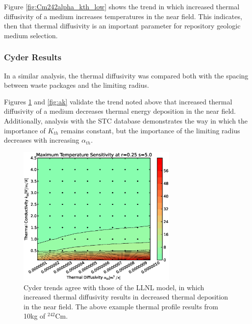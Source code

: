 Figure \ref{fig:Cm242alpha_kth_low} shows the trend in which increased thermal 
diffusivity of a medium increases temperatures in the near field. This 
indicates, then that thermal diffusivity is an important parameter for 
repository geologic medium selection.

%


\FloatBarrier
\subsubsection{Cyder Results}

In a similar analysis, the thermal diffusivity was compared both with the 
spacing between waste packages and the limiting radius. 

Figures \ref{fig:ar} and \ref{fig:ak} validate the trend noted above that 
increased thermal diffusivity of a medium decreases thermal energy deposition 
in the near field.  Additionally, analysis with the \Cyder STC database 
demonstrates the way in which the importance of $K_{th}$ remains constant, but 
the importance of the limiting radius decreases with increasing $\alpha_{th}$.

\begin{figure}[htbp!]
\begin{center}
\includegraphics[width=0.7\textwidth]{./chapters/demonstration/diffusivity/ak.eps}
\end{center}
\caption[$\alpha_{th}$ vs. $K_{th}$ Sensitivity in Cyder]{Cyder trends agree
with those of the LLNL model, in which increased thermal diffusivity results in 
decreased thermal deposition in the near field. The above example thermal 
profile results from 10kg of $^{242}$Cm.} 
\label{fig:ar}
\end{figure}


